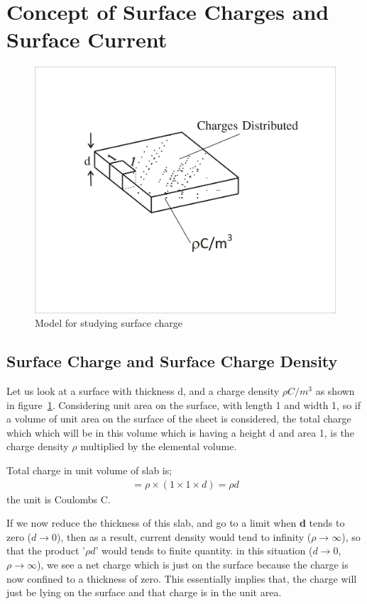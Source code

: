 \section{Concept of Surface Charges and Surface Current}
\begin{figure}[h]
\centering
\includegraphics[width=.7\linewidth]{./graphics/surfacecharge}
\caption{Model for studying surface charge}
\label{fig:surfacecharge}
\end{figure} 

\subsection{Surface Charge and Surface Charge Density}
Let us look at a surface with thickness d, and a charge density $\rho$$C/m^{3}$ as shown in figure~\ref{fig:surfacecharge}. Considering  unit area on the surface, with length 1 and width 1, so if a volume of unit area on the surface of the sheet is considered, the total charge which which will be in this volume which is having a height d and area 1, is the charge density $\rho$ multiplied by the elemental volume.

Total charge in unit volume of slab is;
\begin{align*}
=\rho\times(1\times 1\times d)=\rho d
\end{align*}
the unit is Coulombs C.

If we now reduce the thickness of this slab, and go to a limit when \textbf{d} tends to zero ($d\rightarrow 0$), then as a result, current density would tend to infinity ($\rho\rightarrow\infty$), so that the product '$\rho d$' would tends to finite quantity. in this situation ($d\rightarrow 0$, $\rho\rightarrow\infty$), we see a net charge which is just on the surface because the charge is now confined to a thickness of zero. This essentially implies that, the charge will just be lying on the surface and that charge is in the unit area. 


